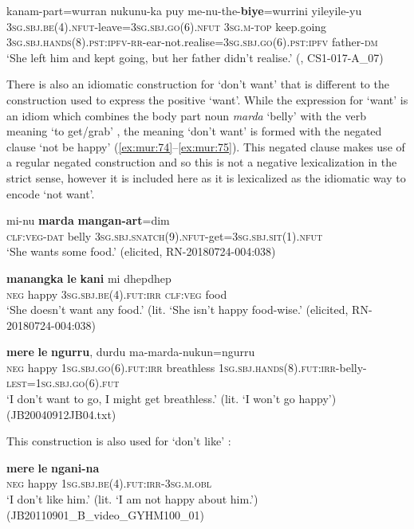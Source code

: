 \documentclass[output=paper,colorlinks,citecolor=brown]{langscibook}
\begin{document}
\ea\label{ex:mur:72}
    \gll kanam-part=wurran nukunu-ka puy me-nu-the-\textbf{biye}=wurrini yileyile-yu\\
         \textsc{3sg.sbj.be(4).nfut-}leave\textsc{=3sg.sbj.go(6).nfut} \textsc{3sg.m-top} keep.going \textsc{3sg.sbj.hands(8).pst:ipfv-rr}{}-ear-not.realise=\textsc{3sg.sbj.go(6).pst:ipfv} father-\textsc{dm}\\
    \glt ‘She left him and kept going, but her father didn’t realise.’ (\citealt{MansfieldEtAl2019}, CS1-017-A\_07)
\z 

There is also an idiomatic construction for ‘don’t want’ that is different to the construction used to express the positive ‘want’. While the expression for ‘want’ is an idiom which combines the body part noun \textit{marda} ‘belly’ with the verb meaning ‘to get/grab’ , the meaning ‘don’t want’ is formed with the negated clause ‘not be happy’ (\ref{ex:mur:74}--\ref{ex:mur:75}). This negated clause makes use of a regular negated construction and so this is not a negative lexicalization in the strict sense, however it is included here as it is lexicalized as the idiomatic way to encode ‘not want’.

\ea\label{ex:mur:73}
    \gll mi-nu \textbf{marda} \textbf{mangan-art}=dim\\
          \textsc{clf:veg-dat} belly \textsc{3sg.sbj.snatch(9).nfut}{}-get=\textsc{3sg.sbj.sit(1).nfut}\\
    \glt ‘She wants some food.’ (elicited, RN-20180724-004:038)
\z 

\ea\label{ex:mur:74}
    \gll \textbf{manangka} \textbf{le} \textbf{kani} mi dhepdhep\\
         \textsc{neg} happy \textsc{3sg.sbj.be(4).fut:irr} \textsc{clf:veg} food\\
    \glt ‘She doesn’t want any food.’ (lit. ‘She isn’t happy food-wise.’ (elicited, RN-20180724-004:038)
\z 

\ea\label{ex:mur:75}
    \gll \textbf{mere} \textbf{le} \textbf{ngurru}, durdu ma-marda-nukun=ngurru \\
         \textsc{neg} happy \textsc{1sg.sbj.go(6).fut:irr} breathless \textsc{1sg.sbj.hands(8).fut:irr}{}-belly-\textsc{lest=1sg.sbj.go(6).fut}\\
    \glt ‘I don’t want to go, I might get breathless.’ (lit. ‘I won’t go happy’) (JB20040912JB04.txt)
\z 

This construction is also used for ‘don’t like’ :

\ea\label{ex:mur:76}
    \gll \textbf{mere} \textbf{le} \textbf{ngani-na}\\
         \textsc{neg} happy \textsc{1sg.sbj.be(4).fut:irr-3sg.m.obl}\\
    \glt ‘I don’t like him.’ (lit. ‘I am not happy about him.’) (JB20110901\_B\_video\_GYHM100\_01)
\z 
\end{document}
